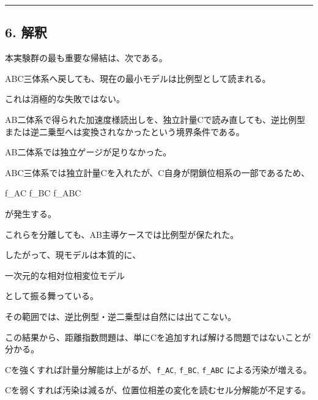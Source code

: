 \documentclass[
]{article}
\newenvironment{Shaded}{}{}
\newcommand{\NormalTok}[1]{#1}
\begin{document}
\begin{center}\rule{0.5\linewidth}{0.5pt}\end{center}

\subsection{6. 解釈}\label{ux89e3ux91c8}

本実験群の最も重要な帰結は、次である。

\begin{Shaded}
\begin{Highlighting}[]
\NormalTok{ABC三体系へ戻しても、現在の最小モデルは比例型として読まれる。}
\end{Highlighting}
\end{Shaded}

これは消極的な失敗ではない。

AB二体系で得られた加速度様読出しを、独立計量Cで読み直しても、逆比例型または逆二乗型へは変換されなかったという境界条件である。

AB二体系では独立ゲージが足りなかった。

ABC三体系では独立計量Cを入れたが、C自身が閉鎖位相系の一部であるため、

\begin{Shaded}
\begin{Highlighting}[]
\NormalTok{f\_AC}
\NormalTok{f\_BC}
\NormalTok{f\_ABC}
\end{Highlighting}
\end{Shaded}

が発生する。

これらを分離しても、AB主導ケースでは比例型が保たれた。

したがって、現モデルは本質的に、

\begin{Shaded}
\begin{Highlighting}[]
\NormalTok{一次元的な相対位相変位モデル}
\end{Highlighting}
\end{Shaded}

として振る舞っている。

その範囲では、逆比例型・逆二乗型は自然には出てこない。

この結果から、距離指数問題は、単にCを追加すれば解ける問題ではないことが分かる。

Cを強くすれば計量分解能は上がるが、\texttt{f\_AC}, \texttt{f\_BC},
\texttt{f\_ABC} による汚染が増える。

Cを弱くすれば汚染は減るが、位置位相差の変化を読むセル分解能が不足する。
\end{document}
